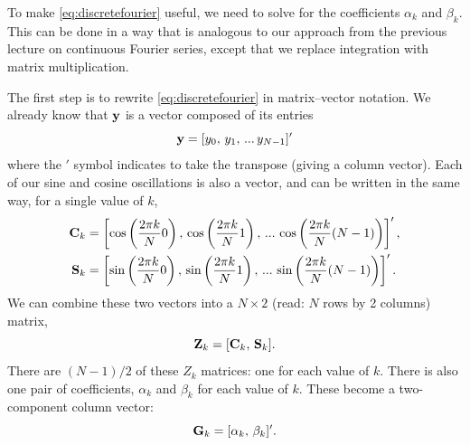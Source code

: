 \documentclass[11pt,twoside,a4paper]{article}
\begin{document}
To make \autoref{eq:discretefourier} useful, we need to solve for the
coefficients $\alpha_k$ and $\beta_k$.  This can be done in a way that
is analogous to our approach from the previous lecture on continuous
Fourier series, except that we replace integration with matrix
multiplication. 

The first step is to rewrite \autoref{eq:discretefourier} in
matrix--vector notation.  We already know that $\mbox{{\bf y}}$ is a vector
composed of its entries
\begin{equation}
  \label{eq:yvec}
  \mbox{{\bf y}} = [y_0,\,y_1,\,...\,y_{N-1}]'
\end{equation}
where the $'$ symbol indicates to take the transpose (giving a column
vector).  Each of our sine and cosine oscillations is also a vector,
and can be written in the same way, for a single value of $k$,
\begin{subequations}
  \label{eq:sinevec}
  \begin{align}
    \mbox{{\bf C}}_k &= \left[\cos\left(\frac{2\pi k}{N}0\right),\,
      \cos\left(\frac{2\pi
          k}{N}1\right),\, ... \,\cos\left(\frac{2\pi k}{N}(N-1)\right)\right]',\\
    \mbox{{\bf S}}_k &= \left[\sin\left(\frac{2\pi k}{N}0\right),\,
      \sin\left(\frac{2\pi k}{N}1\right),\, ... \,\sin\left(\frac{2\pi
          k}{N}(N-1)\right)\right]'.
  \end{align}
\end{subequations}
We can combine these two vectors into a $N\times2$ (read: $N$ rows by
2 columns) matrix,
\begin{equation}
  \label{eq:matrix}
  \mbox{{\bf Z}}_k = [\mbox{{\bf C}}_k,\,\mbox{{\bf S}}_k].
\end{equation}
There are $(N-1)/2$ of these $Z_k$ matrices: one for each value of
$k$. There is also one pair of coefficients, $\alpha_k$ and $\beta_k$
for each value of $k$.  These become a two-component column vector:
\begin{equation}
  \label{eq:coefvec}
  \mbox{{\bf G}}_k = [\alpha_k,\,\beta_k]'.
\end{equation}
\end{document}

